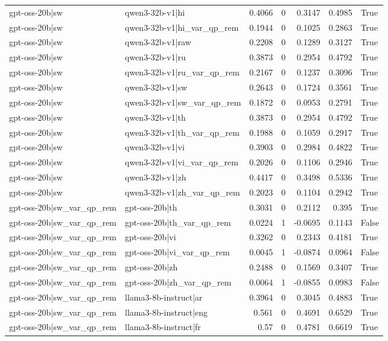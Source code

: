 \begin{table}
\begin{tabular}{l l r r r r l}
gpt-oss-20b|sw & qwen3-32b-v1|hi & 0.4066 & 0 & 0.3147 & 0.4985 & True \\
gpt-oss-20b|sw & qwen3-32b-v1|hi_var_qp_rem & 0.1944 & 0 & 0.1025 & 0.2863 & True \\
gpt-oss-20b|sw & qwen3-32b-v1|raw & 0.2208 & 0 & 0.1289 & 0.3127 & True \\
gpt-oss-20b|sw & qwen3-32b-v1|ru & 0.3873 & 0 & 0.2954 & 0.4792 & True \\
gpt-oss-20b|sw & qwen3-32b-v1|ru_var_qp_rem & 0.2167 & 0 & 0.1237 & 0.3096 & True \\
gpt-oss-20b|sw & qwen3-32b-v1|sw & 0.2643 & 0 & 0.1724 & 0.3561 & True \\
gpt-oss-20b|sw & qwen3-32b-v1|sw_var_qp_rem & 0.1872 & 0 & 0.0953 & 0.2791 & True \\
gpt-oss-20b|sw & qwen3-32b-v1|th & 0.3873 & 0 & 0.2954 & 0.4792 & True \\
gpt-oss-20b|sw & qwen3-32b-v1|th_var_qp_rem & 0.1988 & 0 & 0.1059 & 0.2917 & True \\
gpt-oss-20b|sw & qwen3-32b-v1|vi & 0.3903 & 0 & 0.2984 & 0.4822 & True \\
gpt-oss-20b|sw & qwen3-32b-v1|vi_var_qp_rem & 0.2026 & 0 & 0.1106 & 0.2946 & True \\
gpt-oss-20b|sw & qwen3-32b-v1|zh & 0.4417 & 0 & 0.3498 & 0.5336 & True \\
gpt-oss-20b|sw & qwen3-32b-v1|zh_var_qp_rem & 0.2023 & 0 & 0.1104 & 0.2942 & True \\
gpt-oss-20b|sw_var_qp_rem & gpt-oss-20b|th & 0.3031 & 0 & 0.2112 & 0.395 & True \\
gpt-oss-20b|sw_var_qp_rem & gpt-oss-20b|th_var_qp_rem & 0.0224 & 1 & -0.0695 & 0.1143 & False \\
gpt-oss-20b|sw_var_qp_rem & gpt-oss-20b|vi & 0.3262 & 0 & 0.2343 & 0.4181 & True \\
gpt-oss-20b|sw_var_qp_rem & gpt-oss-20b|vi_var_qp_rem & 0.0045 & 1 & -0.0874 & 0.0964 & False \\
gpt-oss-20b|sw_var_qp_rem & gpt-oss-20b|zh & 0.2488 & 0 & 0.1569 & 0.3407 & True \\
gpt-oss-20b|sw_var_qp_rem & gpt-oss-20b|zh_var_qp_rem & 0.0064 & 1 & -0.0855 & 0.0983 & False \\
gpt-oss-20b|sw_var_qp_rem & llama3-8b-instruct|ar & 0.3964 & 0 & 0.3045 & 0.4883 & True \\
gpt-oss-20b|sw_var_qp_rem & llama3-8b-instruct|eng & 0.561 & 0 & 0.4691 & 0.6529 & True \\
gpt-oss-20b|sw_var_qp_rem & llama3-8b-instruct|fr & 0.57 & 0 & 0.4781 & 0.6619 & True \\

\end{tabular}
\end{table}
